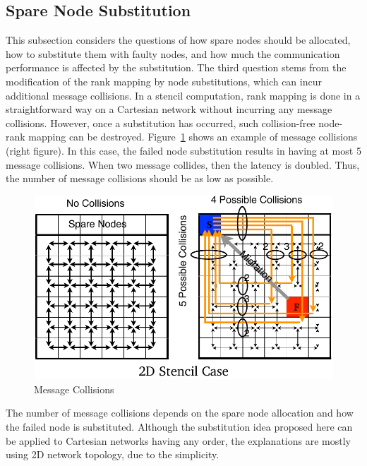 \subsection{Spare Node Substitution}

This subsection considers the questions of how spare nodes should be
allocated, how to substitute them with faulty nodes, and how much the
communication performance is affected by the substitution.
The third question stems from the modification of the rank mapping by
node substitutions, which can incur additional message collisions.
In a stencil computation, rank mapping is done in a
straightforward way on a Cartesian network without incurring any
message collisions. However, once a substitution has occurred, such
collision-free node-rank mapping can be
destroyed. Figure~\ref{fig:message-collisions} shows an example of
message collisions (right figure). In this case, the failed node
substitution results in having 
at most 5 message collisions. When two message
collides, then the latency is doubled. Thus, the number of message
collisions should be as low as possible.

\begin{figure}[ht]
\begin{center}
\includegraphics[width=0.7\columnwidth]{Figs/Collisions.pdf}
  \caption{Message Collisions}
  \label{fig:message-collisions}
\end{center}
\end{figure}

The number of message collisions depends on the spare node allocation
and how the failed node is substituted. Although the substitution idea
proposed here can be applied to Cartesian networks having any order, the
explanations are mostly using 2D network topology, due to the
simplicity. 

